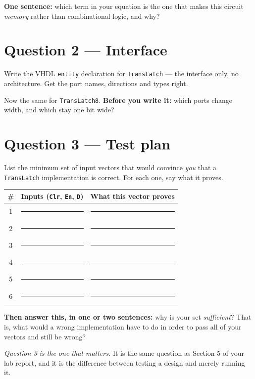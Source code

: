 \documentclass[11pt]{article}
\newcommand{\code}[1]{\texttt{#1}}
\newcommand{\answerbox}[1]{\vspace{2pt}\fbox{\parbox[c][#1][c]{\dimexpr\linewidth-2\fboxsep-2\fboxrule}{\ }}\vspace{4pt}}
\begin{document}
\textbf{One sentence:} which term in your equation is the one that makes this
circuit \emph{memory} rather than combinational logic, and why?

\answerbox{1.6cm}

\section*{Question 2 --- Interface}

Write the VHDL \code{entity} declaration for \code{TransLatch} --- the interface
only, no architecture. Get the port names, directions and types right.

\answerbox{4.2cm}

Now the same for \code{TransLatch8}. \textbf{Before you write it:} which ports
change width, and which stay one bit wide?

\answerbox{4.2cm}

\section*{Question 3 --- Test plan}

List the minimum set of input vectors that would convince \emph{you} that a
\code{TransLatch} implementation is correct. For each one, say what it proves.

\begin{center}
\begin{tabular}{@{}c@{\hskip 8pt}p{5.2cm}@{\hskip 8pt}p{7.6cm}@{}}
\toprule
\# & Inputs (\code{Clr}, \code{En}, \code{D}) & What this vector proves \\
\midrule
1 & \rule{5cm}{0.4pt} & \rule{7.4cm}{0.4pt} \\[8pt]
2 & \rule{5cm}{0.4pt} & \rule{7.4cm}{0.4pt} \\[8pt]
3 & \rule{5cm}{0.4pt} & \rule{7.4cm}{0.4pt} \\[8pt]
4 & \rule{5cm}{0.4pt} & \rule{7.4cm}{0.4pt} \\[8pt]
5 & \rule{5cm}{0.4pt} & \rule{7.4cm}{0.4pt} \\[8pt]
6 & \rule{5cm}{0.4pt} & \rule{7.4cm}{0.4pt} \\
\bottomrule
\end{tabular}
\end{center}

\textbf{Then answer this, in one or two sentences:} why is your set
\emph{sufficient}? That is, what would a wrong implementation have to do in order
to pass all of your vectors and still be wrong?

\answerbox{2.2cm}

\vfill
{\small\emph{Question 3 is the one that matters.} It is the same question as
Section 5 of your lab report, and it is the difference between testing a design
and merely running it.}
\end{document}

